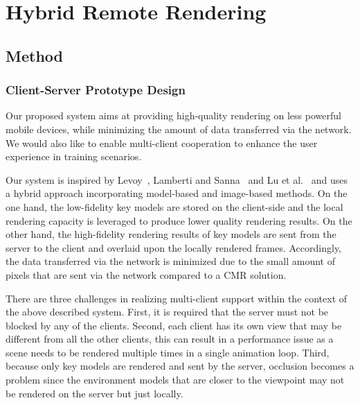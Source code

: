 \chapter{Hybrid Remote Rendering}
\label{chap:hrr}

\section{Method}
\label{sec:method}

\subsection{Client-Server Prototype Design}
\label{sec:method:cspd}

Our proposed system aims at providing high-quality rendering on less powerful mobile devices, while minimizing the amount of data transferred via the network. We would also like to enable multi-client cooperation to enhance the user experience in training scenarios.

Our system is inspired by Levoy~\cite{levoy1995}, Lamberti and Sanna~\cite{lamberti2007} and Lu et al.~\cite{lu2011} and uses a hybrid approach incorporating model-based and image-based methods.
On the one hand, the low-fidelity key models are stored on the client-side and the local rendering capacity is leveraged to produce lower quality rendering results.
On the other hand, the high-fidelity rendering results of key models are sent from the server to the client and overlaid upon the locally rendered frames.
Accordingly, the data transferred via the network is minimized due to the small amount of pixels that are sent via the network compared to a CMR solution. 

There are three challenges in realizing multi-client support within the context of the above described system.
First, it is required that the server must not be blocked by any of the clients.
Second, each client has its own view that may be different from all the other clients, this can result in a performance issue as a scene needs to be rendered multiple times in a single animation loop.
Third, because only key models are rendered and sent by the server, occlusion becomes a problem since the environment models that are closer to the viewpoint may not be rendered on the server but just locally.

